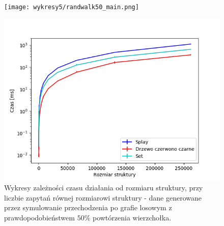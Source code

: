 \documentclass[declaration,shortabstract]{iithesis}
\theoremstyle{thm}
\theoremstyle{remark}
\theoremstyle{plain}
\theoremstyle{plain}
\theoremstyle{plain}
\begin{document}
\begin{figure}[H]
\begin{minipage}[b]{.45\textwidth}
\centering
\texttt{[image: wykresy5/randwalk50\_main.png]}
\end{minipage}
\hfill
\begin{minipage}[b]{.45\textwidth}
\centering
\includegraphics[width=1\textwidth]{wykresy3/randwalk50_main.png}
\end{minipage}
\caption{Wykresy zależności czasu działania od rozmiaru struktury, przy liczbie zapytań równej rozmiarowi struktury - dane generowane przez symulowanie przechodzenia po grafie losowym z prawdopodobieństwem  \(50\%\) powtórzenia wierzchołka.}
\end{figure}
\end{document}
